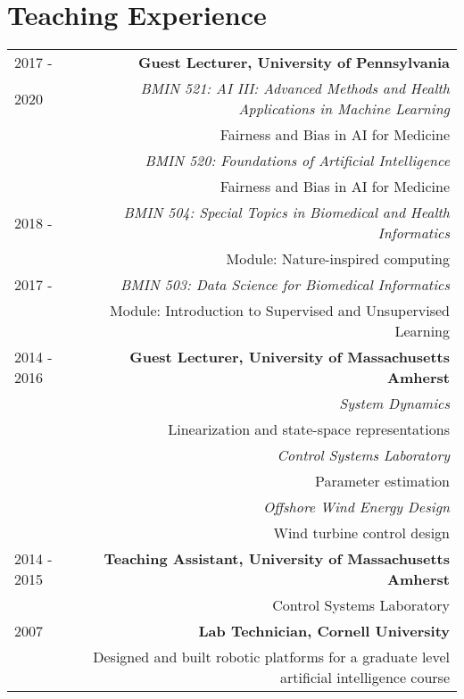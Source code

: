 \section*{Teaching Experience}
\begin{tabular}{L!{\VRule}R}
2017 -  & {\bf Guest Lecturer, University of Pennsylvania}\\
2020    & \textit{BMIN 521: AI III: Advanced Methods and Health Applications in Machine Learning}  \\
        & \hspace{1em} Fairness and Bias in AI for Medicine \\
        & \textit{BMIN 520: Foundations of Artificial Intelligence}  \\
        & \hspace{1em} Fairness and Bias in AI for Medicine \\
2018 -  & \textit{BMIN 504: Special Topics in Biomedical and Health Informatics} \\
        & \hspace{1em} Module: Nature-inspired computing \\
2017 -  & \textit{BMIN 503: Data Science for Biomedical Informatics} \\
        & \hspace{1em} Module: Introduction to Supervised and Unsupervised Learning \\
2014 - 2016 & {\bf Guest Lecturer, University of Massachusetts Amherst}\\
            & \textit{System Dynamics}\\
            & \hspace{1em} Linearization and state-space representations\\
            & \textit{Control Systems Laboratory}\\
            & \hspace{1em} Parameter estimation\\
            & \textit{Offshore Wind Energy Design}\\
            & \hspace{1em} Wind turbine control design \\
2014 - 2015& {\bf Teaching Assistant, University of Massachusetts Amherst} \\
& Control Systems Laboratory \\
2007& {\bf Lab Technician, Cornell University}\\
& Designed and built robotic platforms for a graduate level artificial intelligence course\\
\end{tabular}
